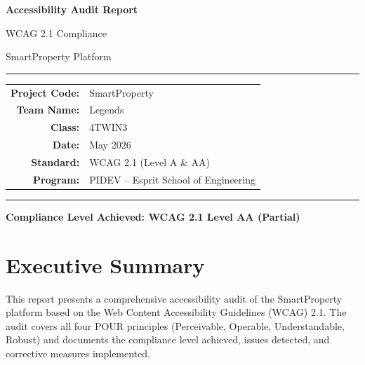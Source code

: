 \documentclass[12pt,a4paper]{article}
\begin{document}
\begin{titlepage}
    \centering
    \vspace*{2cm}
    {\Huge\bfseries\textcolor{primaryblue}{Accessibility Audit Report}\par}
    \vspace{0.3cm}
    {\LARGE\textcolor{primaryblue!70}{WCAG 2.1 Compliance}\par}
    \vspace{0.5cm}
    {\LARGE\textcolor{primaryblue!70}{SmartProperty Platform}\par}
    \vspace{2cm}
    \rule{\textwidth}{1pt}\par
    \vspace{1cm}
    \begin{tabular}{rl}
        \textbf{Project Code:} & SmartProperty \\[0.3em]
        \textbf{Team Name:}    & Legends \\[0.3em]
        \textbf{Class:}        & 4TWIN3 \\[0.3em]
        \textbf{Date:}         & May 2026 \\[0.3em]
        \textbf{Standard:}     & WCAG 2.1 (Level A \& AA) \\[0.3em]
        \textbf{Program:}      & PIDEV -- Esprit School of Engineering \\
    \end{tabular}
    \vspace{1cm}\par
    \rule{\textwidth}{1pt}
    \vfill
    {\large\textbf{Compliance Level Achieved: WCAG 2.1 Level AA (Partial)}\par}
    \vspace{1cm}
\end{titlepage}

\tableofcontents
\newpage

\section{Executive Summary}

This report presents a comprehensive accessibility audit of the SmartProperty platform based on the Web Content Accessibility Guidelines (WCAG) 2.1. The audit covers all four POUR principles (Perceivable, Operable, Understandable, Robust) and documents the compliance level achieved, issues detected, and corrective measures implemented.
\end{document}
